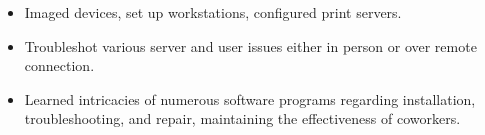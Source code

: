 \documentclass[11pt]{article}
\begin{document}
{%
    \begin{itemize}[noitemsep,nolistsep,leftmargin=30pt]
        \item Imaged devices, set up workstations, configured print servers. 
        \item Troubleshot various server and user issues either in person or over remote connection.
        \item Learned intricacies of numerous software programs regarding installation, troubleshooting, and repair, maintaining the effectiveness of coworkers. 
    \end{itemize}
    \vspace{3mm}


}
\end{document}
